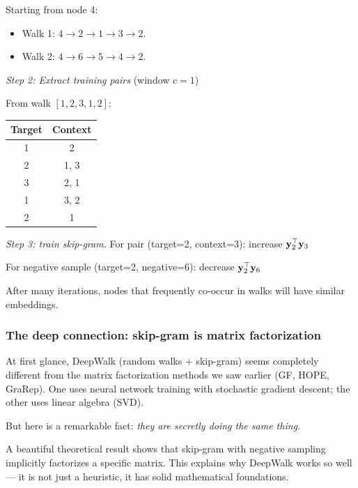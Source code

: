 \begin{notechapter}
\begin{example}
Starting from node 4:
\begin{itemize}
    \item Walk 1: $4 \to 2 \to 1 \to 3 \to 2$.
    \item Walk 2: $4 \to 6 \to 5 \to 4 \to 2$.
\end{itemize}

\emph{Step 2: Extract training pairs} (window $c=1$)

From walk $[1, 2, 3, 1, 2]$:
\begin{center}
\begin{tabular}{cc}
\toprule
Target & Context \\
\midrule
1 & 2 \\
2 & 1, 3 \\
3 & 2, 1 \\
1 & 3, 2 \\
2 & 1 \\
\bottomrule
\end{tabular}
\end{center}

\emph{Step 3: train skip-gram.}
For pair (target=2, context=3): increase $\mathbf{y}_2^\top \mathbf{y}_3$

For negative sample (target=2, negative=6): decrease $\mathbf{y}_2^\top \mathbf{y}_6$

After many iterations, nodes that frequently co-occur in walks will have similar embeddings.
\end{example}

\subsubsection*{The deep connection: skip-gram is matrix factorization}

At first glance, DeepWalk (random walks + skip-gram) seems completely different from the matrix factorization methods we saw earlier (GF, HOPE, GraRep). One uses neural network training with stochastic gradient descent; the other uses linear algebra (SVD).

\begin{intuition}[Motivation]
But here is a remarkable fact: \emph{they are secretly doing the same thing}.

A beautiful theoretical result shows that skip-gram with negative sampling implicitly factorizes a specific matrix. This explains why DeepWalk works so well --- it is not just a heuristic, it has solid mathematical foundations.
\end{intuition}


\end{notechapter}
